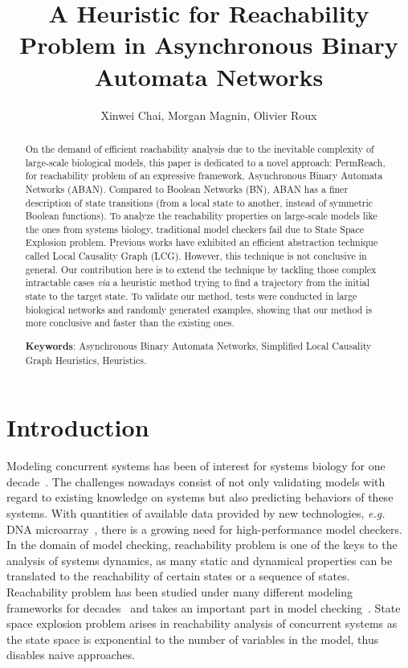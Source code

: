 \documentclass{article}
\theoremstyle{definition}
\begin{document}
%
\title{A Heuristic for Reachability Problem in Asynchronous Binary Automata Networks}
\author{Xinwei Chai, Morgan Magnin, Olivier Roux}
%
\date{}
\maketitle             
\begin{abstract}
On the demand of efficient reachability analysis due to the inevitable complexity of large-scale biological models, this paper is dedicated to a novel approach: PermReach, for reachability problem of an expressive framework, Asynchronous Binary Automata Networks (ABAN). 
Compared to Boolean Networks (BN), ABAN has a finer description of state transitions (from a local state to another, instead of symmetric Boolean functions). 
To analyze the reachability properties on large-scale models like the ones from systems biology, traditional model checkers fail due to State Space Explosion problem.
Previous works have exhibited an efficient abstraction technique called Local Causality Graph (LCG).
However, this technique is not conclusive in general.
Our contribution here is to extend the technique by tackling those complex intractable cases \textit{via} a heuristic method trying to find a trajectory from the initial state to the target state. 
To validate our method, tests were conducted in large biological networks and randomly generated examples, showing that our method is more conclusive and faster than the existing ones.

\textbf{Keywords}: Asynchronous Binary Automata Networks, Simplified Local Causality Graph Heuristics, Heuristics.
\end{abstract}
\section{Introduction}
\label{intro}
Modeling concurrent systems has been of interest for systems biology for one decade~\cite{bockmayr2002using,bortolussi2008modeling,wiley2003computational}. 
The challenges nowadays consist of not only validating models with regard to existing knowledge on systems but also predicting behaviors of these systems. 
With quantities of available data provided by new technologies, \textit{e.g.} DNA microarray~\cite{marx2013}, there is a growing need for high-performance model checkers.
In the domain of model checking, reachability problem is one of the keys to the analysis of systems dynamics, as many static and dynamical properties can be translated to the reachability of certain states or a sequence of states.
Reachability problem has been studied under many different modeling frameworks for decades~\cite{akutsu2007control,barrett2006complexity,Daws1998,esparza1998,mayr1984,wozna2003} and takes an important part in model checking~\cite{clarke2008birth,clarke20142}. 
State space explosion problem arises in reachability analysis of concurrent systems as the state space is exponential to the number of variables in the model, thus disables naive approaches. 
\end{document}

